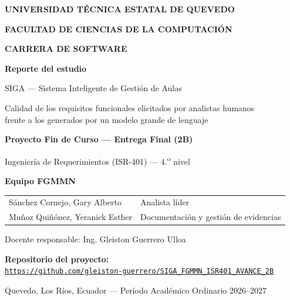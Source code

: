 \documentclass[11pt,a4paper]{article}
\begin{document}
\begin{titlepage}
\centering
\vspace*{1.5cm}

{\bfseries\Large UNIVERSIDAD T\'ECNICA ESTATAL DE QUEVEDO\par}
\vspace{3mm}
{\bfseries\large FACULTAD DE CIENCIAS DE LA COMPUTACI\'ON\par}
\vspace{2mm}
{\bfseries\large CARRERA DE SOFTWARE\par}

\vspace{2cm}
{\bfseries\Large Reporte del estudio\par}
\vspace{5mm}
{\Large SIGA --- Sistema Inteligente de Gesti\'on de Aulas\par}
\vspace{3mm}
{\large Calidad de los requisitos funcionales elicitados por analistas humanos\\
frente a los generados por un modelo grande de lenguaje\par}

\vspace{1.5cm}
{\bfseries Proyecto Fin de Curso --- Entrega Final (2B)\par}
{Ingenier\'ia de Requerimientos (ISR-401) --- 4.\textsuperscript{o} nivel\par}

\vspace{1.5cm}
{\bfseries Equipo FGMMN\par}
\vspace{3mm}
\begin{tabular}{ll}
S\'anchez Cornejo, Gary Alberto      & Analista l\'ider \\
Mu\~noz Qui\~n\'onez, Yeranick Esther & Documentaci\'on y gesti\'on de evidencias \\
\end{tabular}

\vspace{1cm}
{Docente responsable: Ing. Gleiston Guerrero Ulloa\par}

\vfill
{\bfseries Repositorio del proyecto:}\\
\href{https://github.com/gleiston-guerrero/SIGA_FGMMN_ISR401_AVANCE_2B}{\texttt{https://github.com/gleiston-guerrero/SIGA\_FGMMN\_ISR401\_AVANCE\_2B}}

\vspace{8mm}
{Quevedo, Los R\'ios, Ecuador --- Per\'iodo Acad\'emico Ordinario 2026--2027\par}
\end{titlepage}
\end{document}
